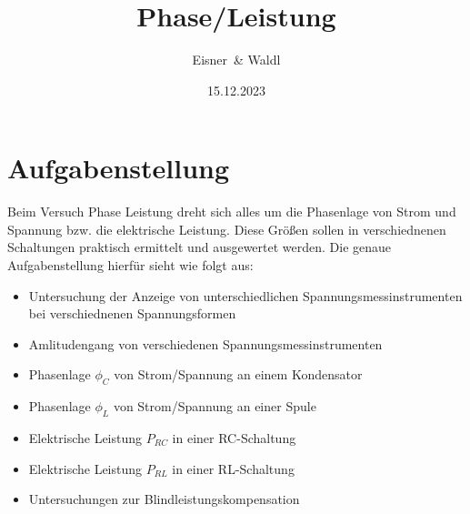 \documentclass[12pt,a4paper,twoside]{article}
\begin{document}
\newcommand\laboratorynumber{2}
\title{Phase/Leistung}
\newcommand\supervisor{Ditlbacher, Harald}
\newcommand\groupnumber{42}

\newcommand\participantonelastname{Eisner}
\newcommand\participantonefirstname{Nico}
\newcommand\participantoneid{12214121}
\newcommand\participanttwolastname{Waldl}
\newcommand\participanttwofirstname{Philip}
\newcommand\participanttwoid{12214120}
\author{\participantonelastname \ \& \participanttwolastname}

\newcommand\degreeid{UB 033 678}
\newcommand\semester{23WS}
\date{15.12.2023}

\newcommand\coursetitle{Laborübungen 2: \\ Elektrizität, Magnetismus, Optik}

%



\tableofcontents
\newpage

\section{Aufgabenstellung} %

Beim Versuch Phase Leistung dreht sich alles um die Phasenlage von Strom und Spannung bzw. die elektrische Leistung.
Diese Größen sollen in verschiednenen Schaltungen praktisch ermittelt und ausgewertet werden. Die genaue Aufgabenstellung hierfür sieht wie folgt aus:

\begin{itemize}
    \item Untersuchung der Anzeige von unterschiedlichen Spannungsmessinstrumenten bei verschiednenen Spannungsformen
    \item Amlitudengang von verschiedenen Spannungsmessinstrumenten
    \item Phasenlage $\phi_C$ von Strom/Spannung an einem Kondensator
    \item Phasenlage $\phi_L$ von Strom/Spannung an einer Spule
    \item Elektrische Leistung $P_{RC}$ in einer RC-Schaltung
    \item Elektrische Leistung $P_{RL}$ in einer RL-Schaltung
    \item Untersuchungen zur Blindleistungskompensation
\end{itemize}
\end{document}
